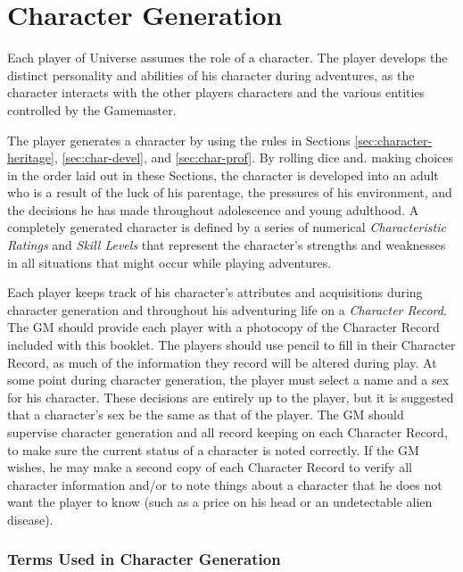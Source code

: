 \chapter{Character Generation}
\label{sec:character-generation}

Each player of Universe assumes the role of a character. The player
develops the distinct personality and abilities of his character
during adventures, as the character interacts with the other players
characters and the various entities controlled by the Gamemaster.

The player generates a character by using the rules in Sections
\ref{sec:character-heritage}, \ref{sec:char-devel}, and
\ref{sec:char-prof}. By rolling dice and. making choices in the order
laid out in these Sections, the character is developed into an adult
who is a result of the luck of his parentage, the pressures of his
environment, and the decisions he has made throughout adolescence and
young adulthood. A completely generated character is defined by a
series of numerical \emph{Characteristic Ratings} and \emph{Skill
  Levels} that represent the character's strengths and weaknesses in
all situations that might occur while playing adventures.

Each player keeps track of his character's attributes and acquisitions
during character generation and throughout his adventuring life on a
\emph{Character Record}. The GM should provide each player with a
photocopy of the Character Record included with this booklet. The
players should use pencil to fill in their Character Record, as much
of the information they record will be altered during play. At some
point during character generation, the player must select a name and a
sex for his character. These decisions are entirely up to the player,
but it is suggested that a character's sex be the same as that of the
player. The GM should supervise character generation and all record
keeping on each Character Record, to make sure the current status of a
character is noted correctly. If the GM wishes, he may make a second
copy of each Character Record to verify all character information
and/or to note things about a character that he does not want the
player to know (such as a price on his head or an undetectable alien
disease).


\subsection*{Terms Used in Character Generation}
\label{sec:terms-used-character}



